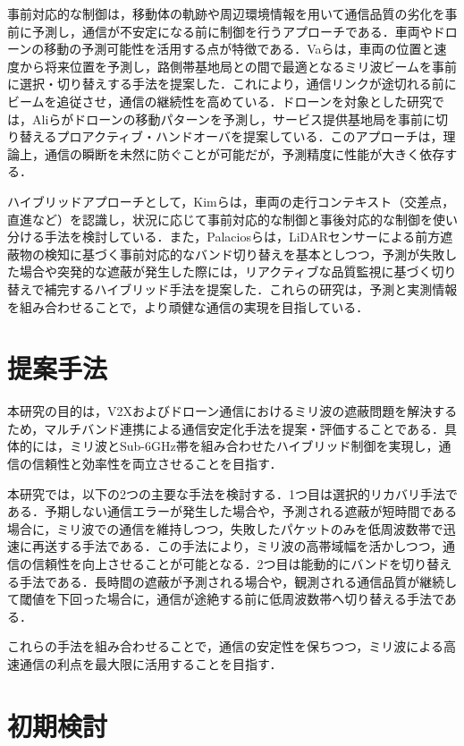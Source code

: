 \documentclass[10pt, twocolumn, a4j, platex]{jsarticle}	%
\begin{document}
事前対応的な制御は，移動体の軌跡や周辺環境情報を用いて通信品質の劣化を事前に予測し，通信が不安定になる前に制御を行うアプローチである．車両やドローンの移動の予測可能性を活用する点が特徴である．Vaら\cite{0003}は，車両の位置と速度から将来位置を予測し，路側帯基地局との間で最適となるミリ波ビームを事前に選択・切り替えする手法を提案した．これにより，通信リンクが途切れる前にビームを追従させ，通信の継続性を高めている．ドローンを対象とした研究では，Aliら\cite{0004}がドローンの移動パターンを予測し，サービス提供基地局を事前に切り替えるプロアクティブ・ハンドオーバを提案している．このアプローチは，理論上，通信の瞬断を未然に防ぐことが可能だが，予測精度に性能が大きく依存する．

ハイブリッドアプローチとして，Kimら\cite{0005}は，車両の走行コンテキスト（交差点，直進など）を認識し，状況に応じて事前対応的な制御と事後対応的な制御を使い分ける手法を検討している．また，Palaciosら\cite{0006}は，LiDARセンサーによる前方遮蔽物の検知に基づく事前対応的なバンド切り替えを基本としつつ，予測が失敗した場合や突発的な遮蔽が発生した際には，リアクティブな品質監視に基づく切り替えで補完するハイブリッド手法を提案した．これらの研究は，予測と実測情報を組み合わせることで，より頑健な通信の実現を目指している．

\section{提案手法}

本研究の目的は，V2Xおよびドローン通信におけるミリ波の遮蔽問題を解決するため，マルチバンド連携による通信安定化手法を提案・評価することである．具体的には，ミリ波とSub-6GHz帯を組み合わせたハイブリッド制御を実現し，通信の信頼性と効率性を両立させることを目指す．

本研究では，以下の2つの主要な手法を検討する．1つ目は選択的リカバリ手法である．予期しない通信エラーが発生した場合や，予測される遮蔽が短時間である場合に，ミリ波での通信を維持しつつ，失敗したパケットのみを低周波数帯で迅速に再送する手法である．この手法により，ミリ波の高帯域幅を活かしつつ，通信の信頼性を向上させることが可能となる．2つ目は能動的にバンドを切り替える手法である．長時間の遮蔽が予測される場合や，観測される通信品質が継続して閾値を下回った場合に，通信が途絶する前に低周波数帯へ切り替える手法である．

これらの手法を組み合わせることで，通信の安定性を保ちつつ，ミリ波による高速通信の利点を最大限に活用することを目指す．

\section{初期検討}
\end{document}
